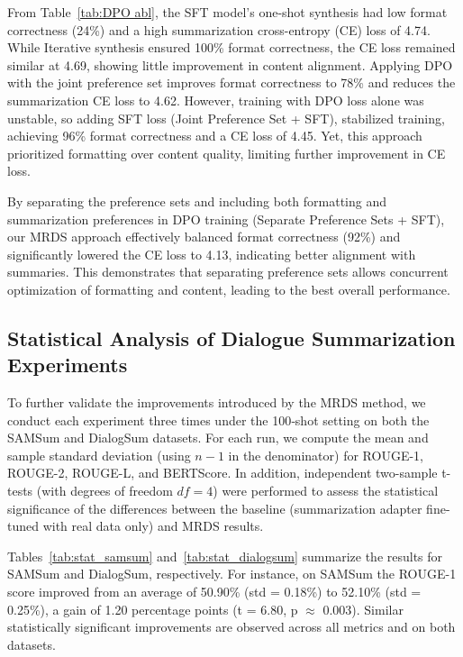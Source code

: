 From Table~\ref{tab:DPO abl}, the SFT model's one-shot synthesis had low format correctness (24\%) and a high summarization cross-entropy (CE) loss of 4.74. While Iterative synthesis ensured 100\% format correctness, the CE loss remained similar at 4.69, showing little improvement in content alignment.
Applying DPO with the joint preference set improves format correctness to 78\% and reduces the summarization CE loss to 4.62. However, training with DPO loss alone was unstable, so adding SFT loss ({Joint Preference Set + SFT}), stabilized training, achieving 96\% format correctness and a CE loss of 4.45. Yet, this approach prioritized formatting over content quality, limiting further improvement in CE loss.

By separating the preference sets and including both formatting and summarization preferences in DPO training ({Separate Preference Sets + SFT}), our MRDS approach effectively balanced format correctness (92\%) and significantly lowered the CE loss to 4.13, indicating better alignment with summaries. This demonstrates that separating preference sets allows concurrent optimization of formatting and content, leading to the best overall performance.

\subsection{Statistical Analysis of Dialogue Summarization Experiments}
To further validate the improvements introduced by the MRDS method, we conduct each experiment three times under the 100‐shot setting on both the SAMSum and DialogSum datasets. For each run, we compute the mean and sample standard deviation (using $n-1$ in the denominator) for ROUGE-1, ROUGE-2, ROUGE-L, and BERTScore. In addition, independent two-sample t-tests (with degrees of freedom $df=4$) were performed to assess the statistical significance of the differences between the baseline (summarization adapter fine-tuned with real data only) and MRDS results.

Tables~\ref{tab:stat_samsum} and~\ref{tab:stat_dialogsum} summarize the results for SAMSum and DialogSum, respectively. For instance, on SAMSum the ROUGE-1 score improved from an average of 50.90\% (std = 0.18\%) to 52.10\% (std = 0.25\%), a gain of 1.20 percentage points (t = 6.80, p $\approx$ 0.003). Similar statistically significant improvements are observed across all metrics and on both datasets.

